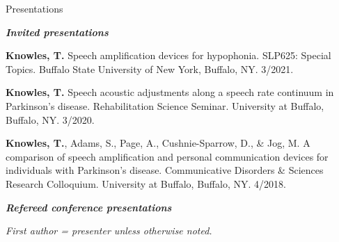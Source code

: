 \documentclass{resume} %
\begin{document}
\begin{rSection}{Presentations}

\begin{center}
	{\bf \emph{Invited presentations}}
\end{center}

\begin{etaremune}

\item {\bf Knowles, T.} Speech amplification devices for hypophonia. SLP625: Special Topics. Buffalo State University of New York, Buffalo, NY. 3/2021.

\item {\bf Knowles, T.} Speech acoustic adjustments along a speech rate continuum in Parkinson's disease. Rehabilitation Science Seminar. University at Buffalo, Buffalo, NY. 3/2020.



\item {\bf Knowles, T.}, Adams, S., Page, A., Cushnie-Sparrow, D., \& Jog, M. A comparison of speech amplification and personal communication devices for individuals with Parkinson's disease. Communicative Disorders \& Sciences Research Colloquium. University at Buffalo, Buffalo, NY. 4/2018.

\end{etaremune}


\begin{center}
	{\bf \emph{Refereed conference presentations}}
	
	\emph{First author = presenter unless otherwise noted.}
\end{center}


\end{rSection}
\end{document}
